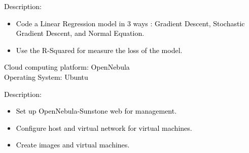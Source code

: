 \documentclass[10pt,a4paper,ragged2e,withhyper]{altacv}
\begin{document}
\begin{paracol}{2}
            \textcolor{black}{Description:} \\
            \vspace{0.5em}
            \begin{itemize}
                \item \textcolor{black}{Code a Linear Regression model in 3 ways : Gradient Descent, Stochastic Gradient Descent, and Normal Equation.}
                \item \textcolor{black}{Use the R-Squared for measure the loss of the model.}
            \end{itemize}
            \divider

            \textcolor{black}{Cloud computing platform: OpenNebula} \\
            \vspace{0.5em}
            \textcolor{black}{Operating System: Ubuntu} \\
            \vspace{0.5em}
            
            \textcolor{black}{Description:} \\
            \vspace{0.5em}
            \begin{itemize}
                \item \textcolor{black}{Set up OpenNebula-Sunstone web for management.}
                \item \textcolor{black}{Configure host and virtual network for virtual machines.}
                \item \textcolor{black}{Create images and virtual machines.}
            \end{itemize}
    \end{paracol}
\end{document}
